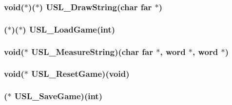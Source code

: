 \label{ID__US_8H_aecad4308d4e4f895479ae314b36ecadb}
\hypertarget{ID__US_8H_a49825cde2ac607e0d17407fb33f14a00}{
\subsubsection[{USL\_\-DrawString}]{\setlength{\rightskip}{0pt plus 5cm}void($\ast$)($\ast$) {\bf USL\_\-DrawString}(char far $\ast$)}}
\label{ID__US_8H_a49825cde2ac607e0d17407fb33f14a00}
\hypertarget{ID__US_8H_a929fff4158aee7d4a88ffc63c52817f1}{
\subsubsection[{USL\_\-LoadGame}]{($\ast$)($\ast$) {\bf USL\_\-LoadGame}(int)}}
\label{ID__US_8H_a929fff4158aee7d4a88ffc63c52817f1}
\hypertarget{ID__US_8H_ac392829f8abc2e03447a6abf023352b1}{
\subsubsection[{USL\_\-MeasureString}]{\setlength{\rightskip}{0pt plus 5cm}void($\ast$ {\bf USL\_\-MeasureString})(char far $\ast$, {\bf word} $\ast$, {\bf word} $\ast$)}}
\label{ID__US_8H_ac392829f8abc2e03447a6abf023352b1}
\hypertarget{ID__US_8H_a7ac3fe59ccca28a6946051e6dc90b372}{
\subsubsection[{USL\_\-ResetGame}]{\setlength{\rightskip}{0pt plus 5cm}void($\ast$ {\bf USL\_\-ResetGame})(void)}}
\label{ID__US_8H_a7ac3fe59ccca28a6946051e6dc90b372}
\hypertarget{ID__US_8H_a26a6bc7aa90c2c828190df5c67db8692}{
\subsubsection[{USL\_\-SaveGame}]{($\ast$ {\bf USL\_\-SaveGame})(int)}}
